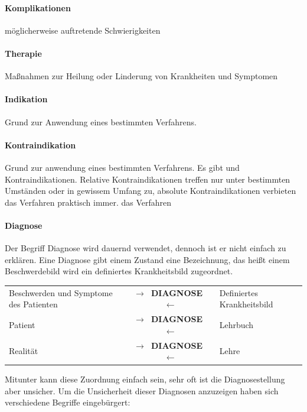 \paragraph{Komplikationen} 
möglicherweise auftretende Schwierigkeiten
\paragraph{Therapie}  Ma{\ss}nahmen zur
Heilung oder Linderung von Krankheiten und Symptomen

\paragraph{Indikation} Grund zur Anwendung eines bestimmten Verfahrens. 
\paragraph{Kontraindikation} Grund zur anwendung eines bestimmten
Verfahrens. Es gibt  und  Kontraindikationen. Relative
Kontraindikationen treffen nur unter bestimmten Umständen oder in gewissem
Umfang zu, absolute Kontraindikationen verbieten das Verfahren praktisch immer. 
das Verfahren

\paragraph{Diagnose} 
Der Begriff Diagnose wird dauernd verwendet, dennoch ist er
nicht einfach zu erklären. Eine Diagnose gibt einem Zustand
eine Bezeichnung, das heißt einem Beschwerdebild wird ein
definiertes Krankheitsbild zugeordnet.

\noindent\begin{tabularx}{\linewidth}{XcX}\toprule
Beschwerden und Symptome des Patienten
&
{\color{darkBlue}\sffamily\bfseries $\rightarrow$~DIAGNOSE~$\leftarrow$}
&
Definiertes Krankheitsbild
\\\addlinespace
Patient
&
{\color{darkBlue}\sffamily\bfseries $\rightarrow$~DIAGNOSE~$\leftarrow$}
&
Lehrbuch
\\\addlinespace
Realität
&
{\color{darkBlue}\sffamily\bfseries $\rightarrow$~DIAGNOSE~$\leftarrow$}
&
Lehre
\\\bottomrule
\end{tabularx}


Mitunter kann diese Zuordnung einfach sein, sehr oft ist die Diagnosestellung
aber unsicher. Um die Unsicherheit dieser Diagnosen
anzuzeigen haben sich verschiedene Begriffe eingebürgert: 

